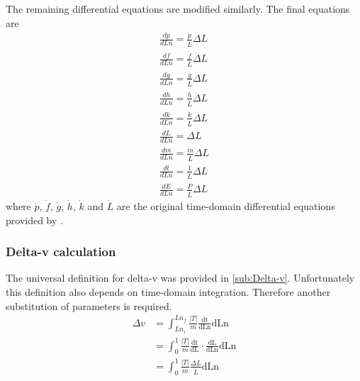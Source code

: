 The remaining differential equations are modified similarly. The final equations are
\begin{subequations}
\begin{gather}
\frac{dp}{dLn}=\frac{\dot{p}}{\dot{L}}\Delta L \\
\frac{df}{dLn}=\frac{\dot{f}}{\dot{L}}\Delta L \\
\frac{dg}{dLn}=\frac{\dot{g}}{\dot{L}}\Delta L \\
\frac{dh}{dLn}=\frac{\dot{h}}{\dot{L}}\Delta L \\
\frac{dk}{dLn}=\frac{\dot{k}}{\dot{L}}\Delta L \\
\frac{dL}{dLn}=\Delta L \\
\frac{dm}{dLn}=\frac{\dot{m}}{\dot{L}}\Delta L \\
\frac{dt}{dLn}=\frac{1}{\dot{L}}\Delta L \\
\frac{dE}{dLn}=\frac{P}{\dot{L}}\Delta L 
\end{gather}
\end{subequations}
where $\dot{p}$, $\dot{f}$,  $\dot{g}$, $\dot{h}$, $\dot{k}$ and $\dot{L}$ are the original time-domain differential equations provided by \textcite{Walker1985}.

\subsubsection{Delta-v calculation}
The universal definition for delta-v was provided in \autoref{sub:Delta-v}. Unfortunately this definition also depends on time-domain integration. Therefore another substitution of parameters is required.
\begin{subequations}
\begin{align}
\Delta v &= \int^{Ln_f}_{Ln_i}\frac{|T|}{m}\frac{\text{dt}}{\text{dLn}}\text{dLn}\\
&= \int^{1}_{0}\frac{|T|}{m}\frac{\text{dt}}{\text{dL}}\cdot\frac{\text{dL}}{\text{dLn}}\text{dLn}\\
&= \int^{1}_{0}\frac{|T|}{m}\frac{\Delta L}{\dot L}\text{dLn}
\end{align}
\end{subequations}

